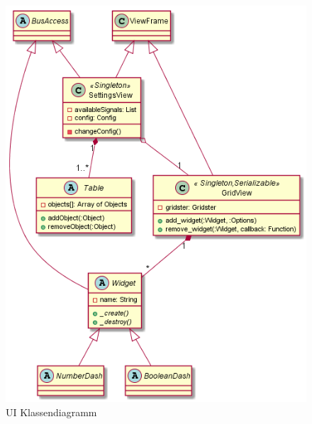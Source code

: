 \documentclass[entwurf.tex]{subfiles}
\begin{document}
		
		\begin{figure}[H]
  			\begin{center}
 				\includegraphics[width=\textwidth]{diagrams/UI.png}
  				\caption{UI Klassendiagramm}
  			\end{center}
  		\end{figure}
  		
  		
  		
  	\newpage
\end{document}
